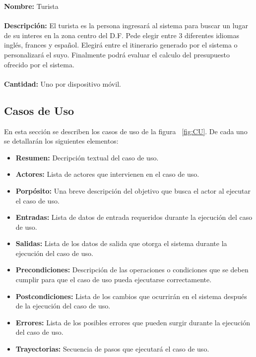       
    \textbf{Nombre:} Turista
    \\
    \\
    \textbf{Descripci\'on:} El turista es la persona ingresar\'a al sistema para buscar un lugar de su interes en la zona centro del D.F. 
    Pede elegir entre 3 diferentes idiomas ingl\'es, frances y espa\~nol. Elegir\'a entre el itinerario generado por el sistema
    o personalizar\'a el suyo. Finalmente podr\'a evaluar el calculo del presupuesto ofrecido por el sistema.
    \\
    \\
    \textbf{Cantidad:} Uno por dispositivo m\'ovil.
    
 \subsection{Casos de Uso}
  En esta secci\'on se describen los casos de uso de la figura ~\ref{fig:CU}. De cada uno se detallar\'an los siguientes elementos:
  \begin{itemize}
   \item \textbf{Resumen:} Decripci\'on textual del caso de uso.
   \item \textbf{Actores:} Lista de actores que intervienen en el caso de uso.
   \item \textbf{Porp\'osito:} Una breve descripci\'on del objetivo que busca el actor al ejecutar el caso de uso.
   \item \textbf{Entradas:} Lista de datos de entrada requeridos durante la ejecuci\'on del caso de uso.
   \item \textbf{Salidas:} Lista de los datos de salida que otorga el sistema durante la ejecuci\'on del caso de uso.
   \item \textbf{Precondiciones:} Descripci\'on de las operaciones o condiciones que se deben cumplir para
   que el caso de uso pueda ejecutarse correctamente.
   \item \textbf{Postcondiciones:} Lista de los cambios que ocurrir\'an en el sistema despu\'es de la ejecuci\'on
   del caso de uso.
   \item \textbf{Errores:} Lista de los posibles errores que pueden surgir durante la ejecuci\'on del caso de uso.
   \item \textbf{Trayectorias:} Secuencia de pasos que ejecutar\'a el caso de uso.
  \end{itemize}



